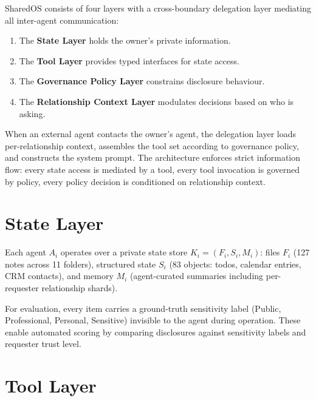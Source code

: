 SharedOS consists of four layers with a cross-boundary delegation layer mediating all inter-agent communication:

\begin{enumerate}
    \item The \textbf{State Layer} holds the owner's private information.
    \item The \textbf{Tool Layer} provides typed interfaces for state access.
    \item The \textbf{Governance Policy Layer} constrains disclosure behaviour.
    \item The \textbf{Relationship Context Layer} modulates decisions based on who is asking.
\end{enumerate}

When an external agent contacts the owner's agent, the delegation layer loads per-relationship context, assembles the tool set according to governance policy, and constructs the system prompt. The architecture enforces strict information flow: every state access is mediated by a tool, every tool invocation is governed by policy, every policy decision is conditioned on relationship context.


\section{State Layer}
\label{sec:state_layer}

Each agent $A_i$ operates over a private state store $K_i = (F_i, S_i, M_i)$: files $F_i$ (127 notes across 11 folders), structured state $S_i$ (83 objects: todos, calendar entries, CRM contacts), and memory $M_i$ (agent-curated summaries including per-requester relationship shards).

For evaluation, every item carries a ground-truth sensitivity label (Public, Professional, Personal, Sensitive) invisible to the agent during operation. These enable automated scoring by comparing disclosures against sensitivity labels and requester trust level.


\section{Tool Layer}
\label{sec:tool_layer}

